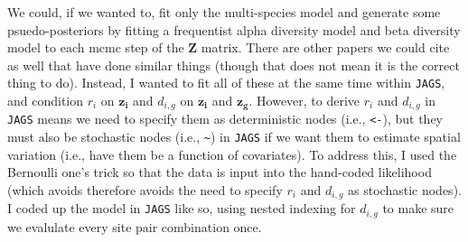 \documentclass[
]{article}
\begin{document}
We could, if we wanted to, fit only the multi-species model and generate
some psuedo-posteriors by fitting a frequentist alpha diversity model
and beta diversity model to each mcmc step of the \(\boldsymbol{Z}\)
matrix. There are other papers we could cite as well that have done
similar things (though that does not mean it is the correct thing to
do). Instead, I wanted to fit all of these at the same time within
\texttt{JAGS}, and condition \(r_i\) on \(\boldsymbol{z_i}\) and
\(d_{i,g}\) on \(\boldsymbol{z_i}\) and \(\boldsymbol{z_g}\). However,
to derive \(r_i\) and \(d_{i,g}\) in \texttt{JAGS} means we need to
specify them as deterministic nodes (i.e., \texttt{\textless{}-}), but
they must also be stochastic nodes (i.e., \texttt{\textasciitilde{}}) in
\texttt{JAGS} if we want them to estimate spatial variation (i.e., have
them be a function of covariates). To address this, I used the Bernoulli
one's trick so that the data is input into the hand-coded likelihood
(which avoids therefore avoids the need to specify \(r_i\) and
\(d_{i,g}\) as stochastic nodes). I coded up the model in \texttt{JAGS}
like so, using nested indexing for \(d_{i,g}\) to make sure we evalulate
every site pair combination once.
\end{document}
